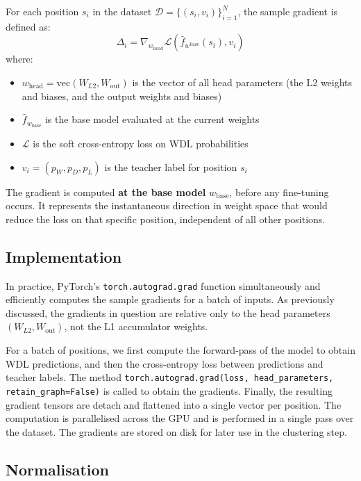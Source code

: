For each position \(s_i\) in the dataset \(\mathcal{D} = \{(s_i, v_i)\}_{i=1}^N\), the sample gradient is defined as:
\[
\Delta_i = \nabla_{w_{\mathrm{head}}} \mathcal{L}(\hat{f}_{w^{\mathrm{base}}}(s_i), v_i)
\]
where:
\begin{itemize}
    \item \(w_{\mathrm{head}} = \mathrm{vec}(W_{L2}, W_{\mathrm{out}})\) is the vector of all head parameters (the L2 weights and biases, and the output weights and biases)
    \item \(\hat{f}_{w_{\mathrm{base}}}\) is the base model evaluated at the current weights
    \item \(\mathcal{L}\) is the soft cross-entropy loss on WDL probabilities
    \item \(v_i = (p_W, p_D, p_L)\) is the teacher label for position \(s_i\)
\end{itemize}
The gradient is computed \textbf{at the base model} \(w_{\mathrm{base}}\), before any fine-tuning occurs. It represents the instantaneous direction in weight space that would reduce the loss on that specific position, independent of all other positions.

\subsection{Implementation}\label{sec:sg-impl}

In practice, PyTorch's \texttt{torch.autograd.grad} function simultaneously and efficiently computes the sample gradients for a batch of inputs. As previously discussed, the gradients in question are relative only to the head parameters \((W_{L2}, W_{\mathrm{out}})\), not the L1 accumulator weights.

For a batch of positions, we first compute the forward-pass of the model to obtain WDL predictions, and then the cross-entropy loss between predictions and teacher labels. The method \texttt{torch.autograd.grad(loss, head\_parameters, retain\_graph=False)} is called to obtain the gradients. Finally, the resulting gradient tensors are detach and flattened into a single vector per position. The computation is parallelised across the GPU and is performed in a single pass over the dataset. The gradients are stored on disk for later use in the clustering step.

\subsection{Normalisation}\label{sec:sg-norm}

